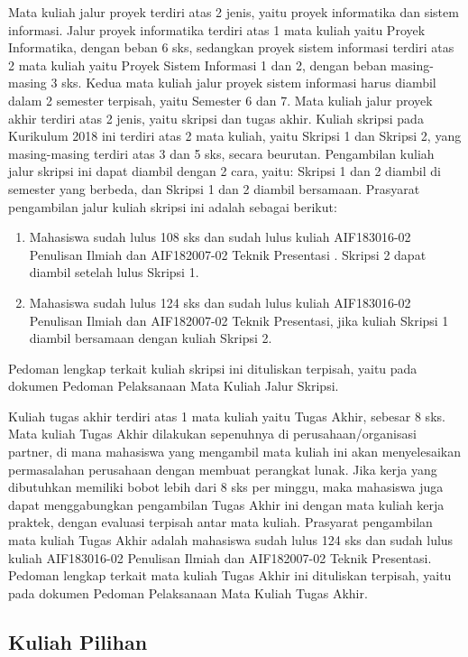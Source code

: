 Mata kuliah jalur proyek  terdiri atas 2 jenis, yaitu proyek informatika dan sistem informasi. Jalur proyek informatika terdiri atas 1 mata kuliah yaitu Proyek Informatika, dengan beban 6 sks, sedangkan proyek sistem informasi terdiri atas 2 mata kuliah yaitu Proyek Sistem Informasi 1 dan 2, dengan beban masing-masing 3 sks. Kedua mata kuliah jalur proyek sistem informasi harus diambil dalam 2 semester terpisah, yaitu Semester 6 dan 7. 
Mata kuliah jalur proyek akhir terdiri atas 2 jenis, yaitu skripsi dan tugas akhir. Kuliah skripsi pada Kurikulum 2018 ini terdiri atas 2 mata kuliah, yaitu Skripsi 1 dan Skripsi 2, yang masing-masing terdiri atas 3 dan 5 sks, secara beurutan. Pengambilan kuliah jalur skripsi ini dapat diambil dengan 2 cara, yaitu: Skripsi 1 dan 2 diambil di semester yang berbeda, dan Skripsi 1 dan 2 diambil bersamaan. Prasyarat pengambilan jalur kuliah skripsi ini adalah sebagai berikut: 
\begin{enumerate}
	\item	Mahasiswa sudah lulus 108 sks dan sudah lulus kuliah AIF183016-02 Penulisan Ilmiah dan AIF182007-02 Teknik Presentasi . Skripsi 2 dapat diambil setelah lulus Skripsi 1.
	\item Mahasiswa sudah lulus 124 sks dan sudah lulus kuliah AIF183016-02 Penulisan Ilmiah dan AIF182007-02 Teknik Presentasi, jika kuliah Skripsi 1 diambil bersamaan dengan kuliah Skripsi 2.
\end{enumerate}
Pedoman lengkap terkait kuliah skripsi ini dituliskan terpisah, yaitu pada dokumen Pedoman Pelaksanaan Mata Kuliah Jalur Skripsi.

Kuliah tugas akhir terdiri atas 1 mata kuliah yaitu Tugas Akhir, sebesar 8 sks. Mata kuliah Tugas Akhir dilakukan sepenuhnya di perusahaan/organisasi partner, di mana mahasiswa yang mengambil mata kuliah ini akan menyelesaikan permasalahan perusahaan dengan membuat perangkat lunak. Jika kerja yang dibutuhkan memiliki bobot lebih dari 8 sks per minggu, maka mahasiswa juga dapat menggabungkan pengambilan Tugas Akhir ini dengan mata kuliah kerja praktek, dengan evaluasi terpisah antar mata kuliah.
Prasyarat pengambilan mata kuliah Tugas Akhir adalah mahasiswa sudah lulus 124 sks dan sudah lulus kuliah AIF183016-02 Penulisan Ilmiah dan AIF182007-02 Teknik Presentasi.
Pedoman lengkap terkait mata kuliah Tugas Akhir ini dituliskan terpisah, yaitu pada dokumen Pedoman Pelaksanaan Mata Kuliah Tugas Akhir.

\subsection{Kuliah Pilihan}


